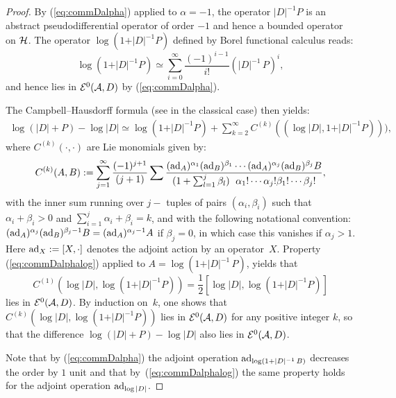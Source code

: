 \documentclass[pdftex]{sigma}
\numberwithin{equation}{section}
\begin{document}
\begin{proof} By  (\ref{eq:commDalpha}) applied to $\alpha=-1$, the operator
$\vert D\vert^{-1}  P$ is an abstract pseudodif\/ferential operator of order $-1$
and hence a bounded operator on ${\cal H}$.   The operator $\log   (1+\vert
D\vert^{-1}  P)$
    def\/ined by  Borel functional calculus reads:
\[
\log  (1+\vert D\vert^{-1}  P)\simeq \sum_{i=0}^\infty
\frac{(-1)^{i-1}}{i!} (\vert D\vert^{-1}\, P)^i,
\] and hence lies in
   ${\cal E}^0({\cal A}, D)$ by (\ref{eq:commDalpha}).


The Campbell--Hausdorf\/f formula (see \cite{O} in the classical case) then yields:
\begin{gather*} \log   (\vert D\vert+P) -\log  \vert D\vert  \simeq
 \log (1+ \vert D\vert^{-1}  P) +\sum_{k=2}^{\infty } C^{(k)}(
  (\log \vert D\vert, 1+ \vert D\vert^{-1}  P) )
  ),
\end{gather*}where  $C^{(k)}( \cdot , \cdot)$ are  Lie monomials given by:
\[
C^{(k)}(A,B):=\sum\limits_{j=1}^\infty \frac{(-1)^{j+1}}{(j+1)} \sum
\frac{({\rm ad }_A)^{\alpha_1}({\rm ad }_B)^{\beta_1}\cdots
 ({\rm ad }_A)^{\alpha_j}({\rm ad }_B)^{\beta_j}B}{(1+ \sum_{l=1}^j
  \beta_l)\\  \alpha_1!\cdots\alpha_j! \beta_1!\cdots\beta_j!},
 \]
  with the inner sum running over $j-$ tuples of pairs $(\alpha_i,
  \beta_i)$ such that $\alpha_i\!+\!\beta_i\!>\!0$ and $\sum\limits_{i=1}^j
  \alpha_i\!+\! \beta_i\!=\! k$, and with the following notational convention:
   $ ({\rm ad
  }_A)^{\alpha_j}({\rm ad }_B)^{\beta_j-1} B=  ({\rm ad
  }_A)^{\alpha_j-1}  A$ if $\beta_j=0$,  in which case this vanishes if
  $\alpha_j>1$. Here ${\rm ad}_X:=[X, \cdot]$ denotes the adjoint
  action  by an opera\-tor~$X$. Property (\ref{eq:commDalphalog}) applied to $A=
  \log(1+ \vert D\vert^{-1}\,P)$,
   yields that
   \[
    C^{(1)}\left(\log \vert D \vert,
  \log(1+ \vert D\vert^{-1} P)\right)= \frac{1}{2}
\left[ \log \vert D \vert,  \log(1+ \vert D\vert^{-1} P)\right]
\] lies in
${\cal E}^0({\cal A}, D)$. By induction on~$k$, one shows that
$
C^{(k)}\left(\log \vert D \vert,
  \log(1+ \vert D\vert^{-1} P)\right)
$  lies in
${\cal E}^0({\cal A}, D)$ for any positive integer $k$,  so that   the
  dif\/ference $\log (\vert D\vert+P)-\log \vert D\vert $ also lies in ${\cal
  E}^0({\cal A}, D)$.

 Note that by (\ref{eq:commDalpha}) the adjoint operation
    ${\rm ad }_{\log(1+ \vert D\vert^{-1}\,B)} $  decreases the order by $1$
     unit and that   by~(\ref{eq:commDalphalog}) the same property holds
      for  the adjoint operation  ${\rm ad }_{\log \vert D\vert} $.  \end{proof}
\end{document}
